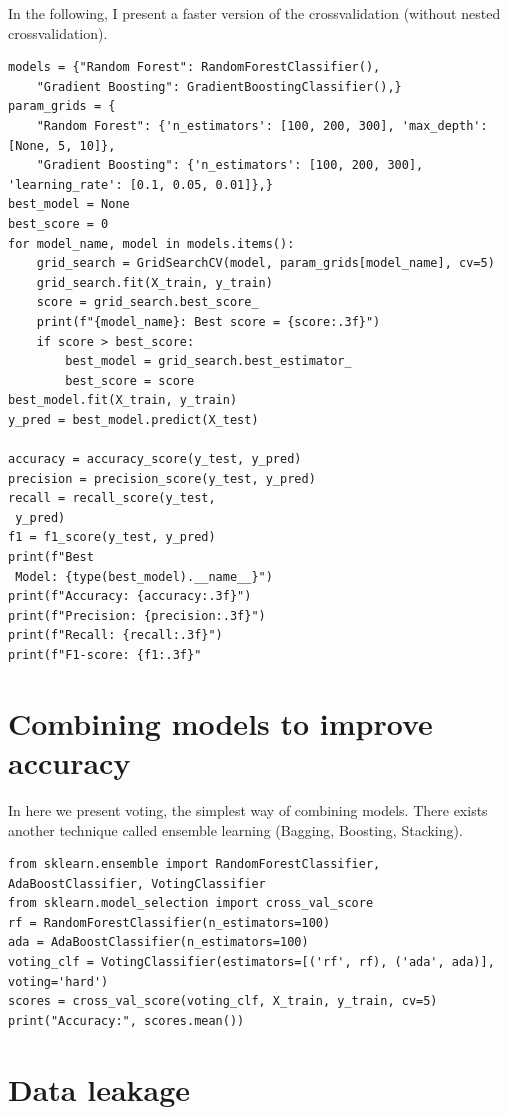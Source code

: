 \documentclass[24pt]{article}
\begin{document}
In the following, I present a faster version of the crossvalidation (without nested crossvalidation).

\begin{lstlisting}  
models = {"Random Forest": RandomForestClassifier(),
    "Gradient Boosting": GradientBoostingClassifier(),}
param_grids = {
    "Random Forest": {'n_estimators': [100, 200, 300], 'max_depth': [None, 5, 10]},
    "Gradient Boosting": {'n_estimators': [100, 200, 300], 'learning_rate': [0.1, 0.05, 0.01]},}
best_model = None
best_score = 0
for model_name, model in models.items():
    grid_search = GridSearchCV(model, param_grids[model_name], cv=5)
    grid_search.fit(X_train, y_train)
    score = grid_search.best_score_
    print(f"{model_name}: Best score = {score:.3f}")
    if score > best_score:
        best_model = grid_search.best_estimator_
        best_score = score
best_model.fit(X_train, y_train)
y_pred = best_model.predict(X_test)   

accuracy = accuracy_score(y_test, y_pred)
precision = precision_score(y_test, y_pred)
recall = recall_score(y_test,   
 y_pred)
f1 = f1_score(y_test, y_pred)
print(f"Best   
 Model: {type(best_model).__name__}")
print(f"Accuracy: {accuracy:.3f}")
print(f"Precision: {precision:.3f}")
print(f"Recall: {recall:.3f}")
print(f"F1-score: {f1:.3f}"
\end{lstlisting}  


\section{Combining models to improve accuracy}
 
In here we present voting, the simplest way of combining models. There exists another technique called ensemble learning (Bagging, Boosting, Stacking).

\begin{lstlisting}  
from sklearn.ensemble import RandomForestClassifier, AdaBoostClassifier, VotingClassifier
from sklearn.model_selection import cross_val_score   
rf = RandomForestClassifier(n_estimators=100)
ada = AdaBoostClassifier(n_estimators=100)
voting_clf = VotingClassifier(estimators=[('rf', rf), ('ada', ada)], voting='hard')
scores = cross_val_score(voting_clf, X_train, y_train, cv=5)
print("Accuracy:", scores.mean())
\end{lstlisting}  



\section{Data leakage}
\end{document}

